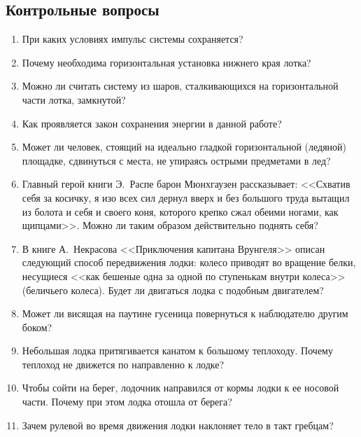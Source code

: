 \documentclass[a4paper, 12pt]{extarticle}
\begin{document}
\subsection{Контрольные вопросы}
\begin{enumerate}
 \item При каких условиях импульс системы сохраняется?
 \item Почему необходима горизонтальная установка нижнего края лотка?
 \item
  Можно ли считать систему из шаров, сталкивающихся на горизонтальной части лотка, замкнутой?
  \item  %
   Как проявляется закон сохранения энергии в данной работе?
   \item Может ли человек, стоящий на идеально гладкой горизонтальной (ледяной) площадке, сдвинуться с места, не упираясь острыми предметами в лед?  %
   \item Главный герой книги Э.~Распе барон Мюнхгаузен рассказывает: <<Схватив себя за косичку, я изо всех сил дернул вверх и без большого труда вытащил из болота и себя и своего коня, которого крепко сжал обеими ногами, как щипцами>>. Можно ли таким образом действительно поднять себя?
   \item В книге А.~Некрасова <<Приключения капитана Врунгеля>> описан следующий способ передвижения лодки: колесо приводят во вращение белки, несущиеся <<как бешеные одна за одной по ступенькам внутри колеса>> (беличьего колеса). Будет ли двигаться лодка с подобным двигателем? %
   \item Может ли висящая на паутине гусеница повернуться к наблюдателю другим боком?
   \item Небольшая лодка притягивается канатом к большому теплоходу. Почему теплоход не движется по направленно к лодке? %
   \item Чтобы сойти на берег, лодочник направился от кормы лодки к ее носовой части. Почему при этом лодка отошла от берега?
   \item Зачем рулевой во время движения лодки наклоняет тело в такт гребцам? %
\end{enumerate}
\end{document}
